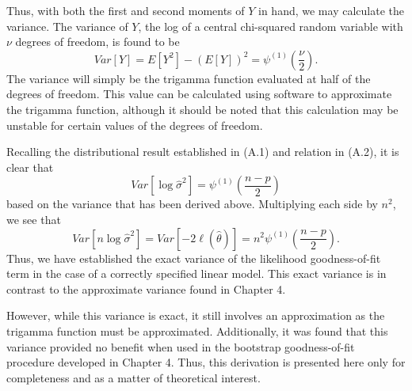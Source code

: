 Thus, with both the first and second moments of $Y$ in hand, we may calculate the variance. The variance of $Y$, the log of a central chi-squared random variable with
$\nu$ degrees of freedom, is found to be
\begin{equation*}
	Var \left[ Y \right ] = E \left[ Y^2 \right] - \left( E \left[ Y \right] \right)^2 = \psi^{(1)} \left( \frac{\nu}{2} \right) .
\end{equation*}
The variance will simply be the trigamma function evaluated at half of the degrees of freedom. This value can be calculated using software to approximate the trigamma function,
although it should be noted that this calculation may be unstable for certain values of the degrees of freedom.

Recalling the distributional result established in (A.1) and relation in (A.2), it is clear that
\begin{equation*}
	Var \left[ \log \hat{\sigma}^2 \right] = \psi^{(1)} \left( \frac{n-p}{2} \right)
\end{equation*}
based on the variance that has been derived above. Multiplying each side by $n^2$, we see that
\begin{equation*}
	Var \left[ n \log \hat{\sigma}^2 \right] = Var \left[ -2 \ell (\hat{\theta} ) \right] = n^2 \psi^{(1)} \left( \frac{n-p}{2} \right).
\end{equation*}
Thus, we have established the exact variance of the likelihood goodness-of-fit term in the case of a correctly specified linear model. This exact variance is in contrast to the
approximate variance found in Chapter 4.

However, while this variance is exact, it still involves an approximation as the trigamma function must be approximated. Additionally, it was found that
this variance provided no benefit when used in the bootstrap goodness-of-fit procedure developed in Chapter 4. Thus, this derivation is presented here only
for completeness and as a matter of theoretical interest.











